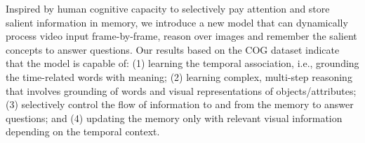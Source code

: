 Inspired by human cognitive capacity to selectively pay attention and store salient information in memory,
we introduce a new model that can dynamically process video input frame-by-frame, reason over images and remember the salient concepts to answer questions.  Our results based on the COG dataset \cite{yang2018dataset} indicate that the model is capable of:
(1) learning the temporal association, i.e., grounding the time-related words with meaning;
(2) learning complex, multi-step reasoning that involves grounding of words and visual representations of objects/attributes;
(3) selectively control the flow of information to and from the memory to answer questions; and
(4) updating the memory only with relevant visual information depending on the temporal context.
%
%







